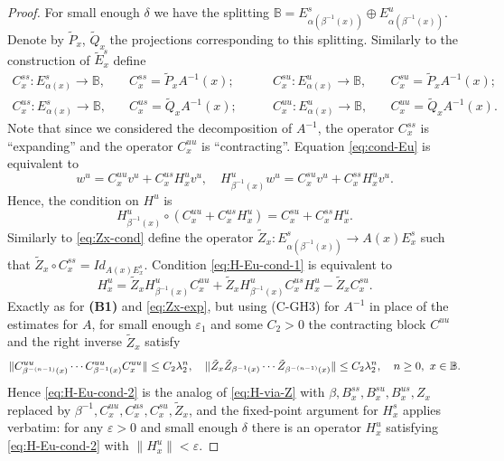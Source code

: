 \documentclass[12pt]{article}
\newcommand{\Bb}{\mathbb{B}}
\theoremstyle{definition}
\begin{document}
\begin{proof}
For small enough $\delta$ we have the splitting $\mathbb{B} = E^s_{\alpha(\beta^{-1}(x))} \oplus E^u_{\alpha(\beta^{-1}(x))}$. Denote by $\tilde{P}_x$, $\tilde{Q}_x$ the projections corresponding to this splitting.
Similarly to the construction of $\tilde{E}^s_x$ define
\begin{align*}
{C}_x^{ss}: E_{\alpha(x)}^s \to \Bb, & \quad  C_x^{ss} = \tilde{P}_{x}A^{-1}(x); &\qquad
{C}_x^{su}: E_{\alpha(x)}^u \to \Bb, & \quad  C_x^{su} = \tilde{P}_{x}A^{-1}(x);\\
{C}_x^{us}: E_{\alpha(x)}^s \to \Bb, & \quad  C_x^{us} = \tilde{Q}_{x}A^{-1}(x); & \qquad
{C}_x^{uu}: E_{\alpha(x)}^u \to \Bb, & \quad  C_x^{uu} = \tilde{Q}_{x}A^{-1}(x).
\end{align*}
Note that since we considered the decomposition of $A^{-1}$, the operator $C_x^{ss}$ is ``expanding'' and the operator $C_x^{uu}$ is ``contracting''.
Equation \eqref{eq:cond-Eu} is equivalent to
$$
w^u = {C}^{uu}_x v^u + C^{us}_x H_{x}^uv^u, 
\quad
H_{\beta^{-1}(x)}^uw^u = {C}^{su}_x v^u + {C}^{ss}_x H_{x}^uv^u.
$$
Hence, the condition on $H^u$ is
\begin{equation}\label{eq:H-Eu-cond-1}
H_{\beta^{-1}(x)}^u \circ \left( {C}^{uu}_x  + C^{us}_x H_{x}^u \right) = {C}^{su}_x + {C}^{ss}_x H_{x}^u.    
\end{equation}
Similarly to \eqref{eq:Zx-cond} define the operator $\tilde{Z}_x:E^s_{\alpha(\beta^{-1}(x))} \to A(x)E^s_x$ such that $\tilde{Z}_x \circ C^{ss}_x = Id_{A(x)E^s_x}$. Condition \eqref{eq:H-Eu-cond-1} is equivalent to
\begin{equation}\label{eq:H-Eu-cond-2}
H_{x}^u = \tilde{Z}_x  H_{\beta^{-1}(x)}^u {C}^{uu}_x + \tilde{Z}_x  H_{\beta^{-1}(x)}^u  C^{us}_x H_{x}^u -\tilde{Z}_x C^{su}_x.
\end{equation}
Exactly as for \textbf{(B1)} and \eqref{eq:Zx-exp}, but using (C-GH3) for $A^{-1}$ in place of the estimates for $A$, for small enough $\varepsilon_1$ and some $C_2 > 0$ the contracting block $C^{uu}$ and the right inverse $\tilde{Z}_x$ satisfy
\begin{equation}\notag%
\|C^{uu}_{\beta^{-(n-1)}(x)} \cdots C^{uu}_{\beta^{-1}(x)}C^{uu}_x\| \leq C_2\lambda_2^n, \quad \|\tilde{Z}_x \tilde{Z}_{\beta^{-1}(x)} \cdots \tilde{Z}_{\beta^{-(n-1)}(x)}\| \leq C_2\lambda_2^n, \quad n \geq 0,\ x \in \Bb.
\end{equation}
Hence \eqref{eq:H-Eu-cond-2} is the analog of \eqref{eq:H-via-Z} with $\beta, B^{ss}_x, B^{su}_x, B^{us}_x, Z_x$ replaced by $\beta^{-1}, C^{uu}_x, C^{us}_x, C^{su}_x, \tilde{Z}_x$, and the fixed-point argument for $H^s_x$ applies verbatim: for any $\varepsilon > 0$ and small enough $\delta$ there is an operator $H^u_x$ satisfying \eqref{eq:H-Eu-cond-2} with $\|H^u_x\| < \varepsilon$.


\end{proof}
\end{document}
